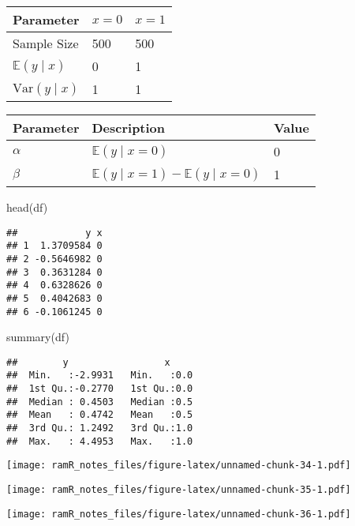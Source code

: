 \documentclass[
]{book}
\newenvironment{Shaded}{\begin{snugshade}}{\end{snugshade}}
\newcommand{\FunctionTok}[1]{\textcolor[rgb]{0.00,0.00,0.00}{#1}}
\newcommand{\NormalTok}[1]{#1}
\theoremstyle{definition}
\theoremstyle{definition}
\theoremstyle{definition}
\theoremstyle{remark}
\begin{document}
\begin{tabular}{l|l|l}
\hline
Parameter & $x = 0$ & $x = 1$\\
\hline
Sample Size & 500 & 500\\
\hline
$\mathbb{E} \left( y \mid x \right)$ & 0 & 1\\
\hline
$\mathrm{Var} \left( y \mid x \right)$ & 1 & 1\\
\hline
\end{tabular}

\begin{tabular}{l|l|l}
\hline
Parameter & Description & Value\\
\hline
$\alpha$ & $\mathbb{E} \left( y \mid x = 0 \right)$ & 0\\
\hline
$\beta$ & $\mathbb{E} \left( y \mid x = 1 \right) - \mathbb{E} \left( y \mid x = 0 \right)$ & 1\\
\hline
\end{tabular}

\begin{Shaded}
\begin{Highlighting}[]
\FunctionTok{head}\NormalTok{(df)}
\end{Highlighting}
\end{Shaded}

\begin{verbatim}
##            y x
## 1  1.3709584 0
## 2 -0.5646982 0
## 3  0.3631284 0
## 4  0.6328626 0
## 5  0.4042683 0
## 6 -0.1061245 0
\end{verbatim}

\begin{Shaded}
\begin{Highlighting}[]
\FunctionTok{summary}\NormalTok{(df)}
\end{Highlighting}
\end{Shaded}

\begin{verbatim}
##        y                 x      
##  Min.   :-2.9931   Min.   :0.0  
##  1st Qu.:-0.2770   1st Qu.:0.0  
##  Median : 0.4503   Median :0.5  
##  Mean   : 0.4742   Mean   :0.5  
##  3rd Qu.: 1.2492   3rd Qu.:1.0  
##  Max.   : 4.4953   Max.   :1.0
\end{verbatim}

\texttt{[image: ramR\_notes\_files/figure-latex/unnamed-chunk-34-1.pdf]}

\texttt{[image: ramR\_notes\_files/figure-latex/unnamed-chunk-35-1.pdf]}

\texttt{[image: ramR\_notes\_files/figure-latex/unnamed-chunk-36-1.pdf]}
\end{document}

